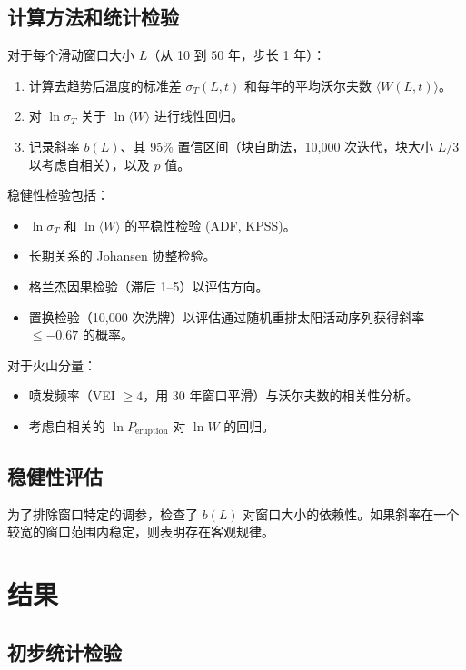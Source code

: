 \documentclass[12pt,a4paper]{article}
\begin{document}
	\subsection{计算方法和统计检验}
	
	对于每个滑动窗口大小 \(L\)（从 10 到 50 年，步长 1 年）：
	\begin{enumerate}
		\item 计算去趋势后温度的标准差 \(\sigma_T(L,t)\) 和每年的平均沃尔夫数 \(\langle W(L,t) \rangle\)。
		\item 对 \(\ln \sigma_T\) 关于 \(\ln \langle W \rangle\) 进行线性回归。
		\item 记录斜率 \(b(L)\)、其 95\% 置信区间（块自助法，10,000 次迭代，块大小 \(L/3\) 以考虑自相关），以及 \(p\) 值。
	\end{enumerate}
	
	稳健性检验包括：
	\begin{itemize}
		\item \(\ln \sigma_T\) 和 \(\ln \langle W \rangle\) 的平稳性检验 (ADF, KPSS)。
		\item 长期关系的 Johansen 协整检验。
		\item 格兰杰因果检验（滞后 1–5）以评估方向。
		\item 置换检验（10,000 次洗牌）以评估通过随机重排太阳活动序列获得斜率 \(\le -0.67\) 的概率。
	\end{itemize}
	
	对于火山分量：
	\begin{itemize}
		\item 喷发频率（VEI \(\ge 4\)，用 30 年窗口平滑）与沃尔夫数的相关性分析。
		\item 考虑自相关的 \(\ln P_{\text{eruption}}\) 对 \(\ln W\) 的回归。
	\end{itemize}
	
	\subsection{稳健性评估}
	
	为了排除窗口特定的调参，检查了 \(b(L)\) 对窗口大小的依赖性。如果斜率在一个较宽的窗口范围内稳定，则表明存在客观规律。
	
	\section{结果}
	
	\subsection{初步统计检验}
	
\end{document}
